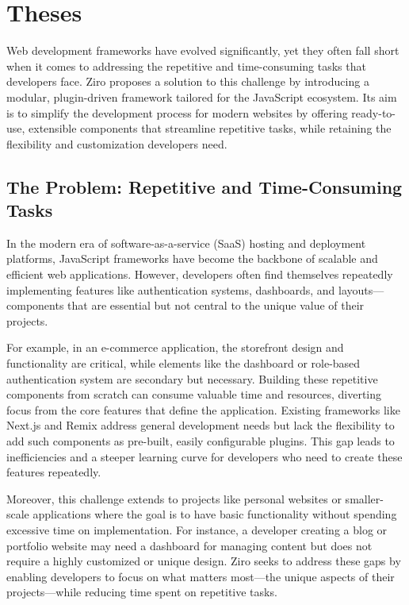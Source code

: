 \section{Theses} %

Web development frameworks have evolved significantly, yet they often fall short when it comes to addressing the repetitive and time-consuming tasks that developers face. Ziro proposes a solution to this challenge by introducing a modular, plugin-driven framework tailored for the JavaScript ecosystem. Its aim is to simplify the development process for modern websites by offering ready-to-use, extensible components that streamline repetitive tasks, while retaining the flexibility and customization developers need.

\subsection{The Problem: Repetitive and Time-Consuming Tasks}

In the modern era of software-as-a-service (SaaS) hosting and deployment platforms, JavaScript frameworks have become the backbone of scalable and efficient web applications. However, developers often find themselves repeatedly implementing features like authentication systems, dashboards, and layouts—components that are essential but not central to the unique value of their projects.

For example, in an e-commerce application, the storefront design and functionality are critical, while elements like the dashboard or role-based authentication system are secondary but necessary. Building these repetitive components from scratch can consume valuable time and resources, diverting focus from the core features that define the application. Existing frameworks like Next.js and Remix address general development needs but lack the flexibility to add such components as pre-built, easily configurable plugins. This gap leads to inefficiencies and a steeper learning curve for developers who need to create these features repeatedly.

Moreover, this challenge extends to projects like personal websites or smaller-scale applications where the goal is to have basic functionality without spending excessive time on implementation. For instance, a developer creating a blog or portfolio website may need a dashboard for managing content but does not require a highly customized or unique design. Ziro seeks to address these gaps by enabling developers to focus on what matters most—the unique aspects of their projects—while reducing time spent on repetitive tasks.

